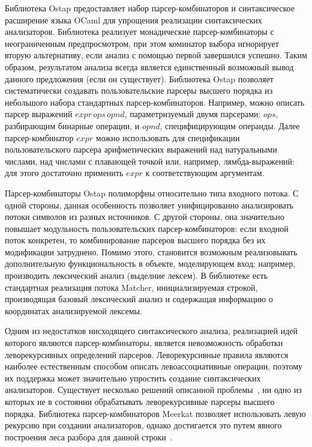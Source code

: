 \documentclass [a4paper] {article}
\begin{document}
Библиотека Ostap предоставляет набор парсер-комбинаторов и синтаксическое расширение языка OCaml для упрощения реализации синтаксических анализаторов. Библиотека реализует монадические парсер-комбинаторы с неограниченным предпросмотром, при этом коминатор выбора игнорирует вторую альтернативу, если анализ с помощью первой завершился успешно. Таким образом, результатом анализа всегда является единственный возможный вывод данного предложения (если он существует). Библиотека Ostap позволяет систематически создавать пользовательские парсеры высшего порядка из небольшого набора стандартных парсер-комбинаторов. Например, можно описать парсер выражений $expr \, ops \, opnd$, параметризуемый двумя парсерами: $ops$, разбирающим бинарные операции, и $opnd$, специфицирующим операнды. Далее парсер-комбинатор $expr$ можно использовать для спецификации пользовательского парсера арифметических выражений над натуральными числами, над числами с плавающей точкой или, например, лямбда-выражений: для этого достаточно применить $expr$ к соответствующим аргументам. 

Парсер-комбинаторы Ostap полиморфны относительно типа входного потока. С одной стороны, данная особенность позволяет унифицированно анализировать потоки символов из разных источников. С другой стороны, она значительно повышает модульность пользовательских парсер-комбинаторов: если входной поток конкретен, то комбинирование парсеров высшего порядка без их модификации затруднено. Помимо этого, становится возможным реализовывать дополнительную функциональность в объекте, моделирующем вход: например, производить лексический анализ (выделние лексем). В библиотеке есть стандартная реализация потока Matcher, инициализируемая строкой, производящая базовый лексический анализ и содержащая информацию о координатах анализируемой лексемы. 

Одним из недостатков нисходящего синтаксического анализа, реализацией идей которого являются парсер-комбинаторы, является невозможность обработки леворекурсивных определений парсеров. Леворекурсивные правила являются наиболее естественным способом описать левоассоциативные операции, поэтому их поддержка может значительно упростить создание синтаксических анализаторов. Существует несколько решений описанной проблемы~\cite{frost2008parser, warth2008packrat}, ни одно из которых не в состоянии обрабатывать леворекурсивные парсеры высшего порядка. Библиотека парсер-комбинаторов Meerkat позволяет использовать левую рекурсию при создании анализаторов, однако достигается это путем явного построения леса разбора для данной строки~\cite{Izmaylova}.
\end{document}
